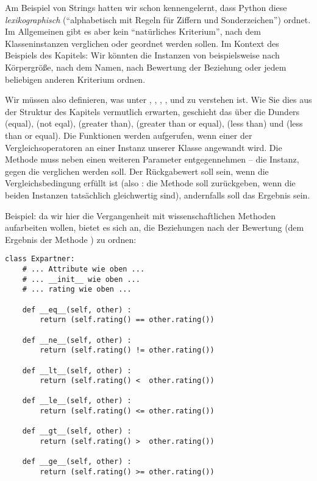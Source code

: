 Am Beispiel von Strings hatten wir schon kennengelernt, dass Python diese \emph{lexikographisch} (\enquote{alphabetisch mit Regeln für Ziffern und Sonderzeichen}) ordnet. Im Allgemeinen gibt es aber kein \enquote{natürliches Kriterium}, nach dem Klasseninstanzen verglichen oder geordnet werden sollen. Im Kontext des Beispiels des Kapitels: Wir könnten die Instanzen von  beispielsweise nach Körpergröße, nach dem Namen, nach Bewertung der Beziehung oder jedem beliebigen anderen Kriterium ordnen.

Wir müssen also definieren, was unter , , , ,  und  zu verstehen ist. Wie Sie dies aus der Struktur des Kapitels vermutlich erwarten, geschieht das über die Dunders  (equal),  (not eqal),  (greater than),  (greater than or equal),  (less than) und  (less than or equal). Die Funktionen werden aufgerufen, wenn einer der Vergleichsoperatoren an einer Instanz unserer Klasse angewandt wird. Die Methode muss neben  einen weiteren Parameter entgegennehmen -- die Instanz, gegen die verglichen werden  soll. Der Rückgabewert soll  sein, wenn die Vergleichsbedingung erfüllt ist (also \eg: die Methode  soll  zurückgeben, wenn die beiden Instanzen tatsächlich gleichwertig sind), andernfalls soll das Ergebnis  sein.

Beispiel: da wir hier die Vergangenheit mit wissenschaftlichen Methoden aufarbeiten wollen, bietet es sich an, die Beziehungen nach der Bewertung (dem Ergebnis der Methode ) zu ordnen:

\begin{codebox}
\begin{verbatim}
class Expartner:
    # ... Attribute wie oben ...
    # ... __init__ wie oben ...
    # ... rating wie oben ...
    
    def __eq__(self, other) :
        return (self.rating() == other.rating())
    
    def __ne__(self, other) :
        return (self.rating() != other.rating())
    
    def __lt__(self, other) :
        return (self.rating() <  other.rating())
    
    def __le__(self, other) :
        return (self.rating() <= other.rating())
    
    def __gt__(self, other) :
        return (self.rating() >  other.rating())
    
    def __ge__(self, other) :
        return (self.rating() >= other.rating())
\end{verbatim}
\end{codebox}

